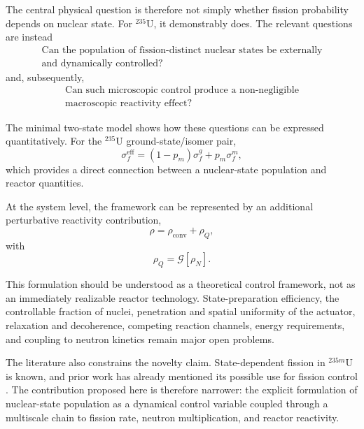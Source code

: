 The central physical question is therefore not simply whether fission probability depends on nuclear state. For $^{235}$U, it demonstrably does. The relevant questions are instead
\begin{equation}
\boxed{
\begin{gathered}
\text{Can the population of fission-distinct nuclear states be externally}\\
\text{and dynamically controlled?}
\end{gathered}
}
\end{equation}
and, subsequently,
\begin{equation}
\boxed{
\begin{gathered}
\text{Can such microscopic control produce a non-negligible}\\
\text{macroscopic reactivity effect?}
\end{gathered}
}
\end{equation}

The minimal two-state model shows how these questions can be expressed quantitatively. For the $^{235}$U ground-state/isomer pair,
\begin{equation}
\sigma_f^{\mathrm{eff}}
=
(1-p_m)\sigma_f^g
+
p_m\sigma_f^m,
\end{equation}
which provides a direct connection between a nuclear-state population and reactor quantities.

At the system level, the framework can be represented by an additional perturbative reactivity contribution,
\begin{equation}
\rho
=
\rho_{\mathrm{conv}}
+
\rho_Q,
\end{equation}
with
\begin{equation}
\rho_Q
=
\mathcal{G}[\rho_N].
\end{equation}

This formulation should be understood as a theoretical control framework, not as an immediately realizable reactor technology. State-preparation efficiency, the controllable fraction of nuclei, penetration and spatial uniformity of the actuator, relaxation and decoherence, competing reaction channels, energy requirements, and coupling to neutron kinetics remain major open problems.

The literature also constrains the novelty claim. State-dependent fission in $^{235m}$U is known, and prior work has already mentioned its possible use for fission control \cite{LiuWang2022}. The contribution proposed here is therefore narrower: the explicit formulation of nuclear-state population as a dynamical control variable coupled through a multiscale chain to fission rate, neutron multiplication, and reactor reactivity.

